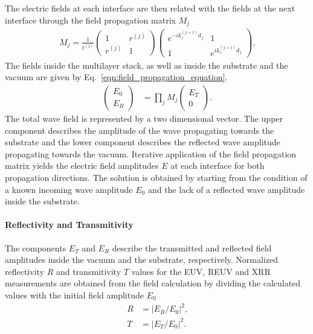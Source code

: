 The electric fields at each interface are then related with the fields at the next interface through the field propagation matrix $M_j$ \cite{mikulik1997x}
\begin{align}
M_j = \frac{1}{t^{(j)}}
\begin{pmatrix}
1 & r^{(j)} \\
r^{(j)} & 1
\end{pmatrix}
\begin{pmatrix}
e^{-i k_z^{(j+1)} d_j} & 1 \\
1 & e^{i k_z^{(j+1)} d_j}
\end{pmatrix}
\text{,} \label{eqn:field_propagation_matrix}
\end{align}
The fields inside the multilayer stack, as well as inside the substrate and the vacuum are given by Eq.~\eqref{eqn:field_propagation_equation}.
\begin{align}
\begin{pmatrix}
E_0 \\
E_R
\end{pmatrix} &=
\prod\limits_{j} M_j
\begin{pmatrix}
E_T \\
0
\end{pmatrix} \text{.} \label{eqn:field_propagation_equation}
\end{align} 
The total wave field is represented by a two dimensional vector. The upper component describes the amplitude of the wave propagating towards the substrate and the lower component describes the reflected wave amplitude propagating towards the vacuum. Iterative application of the field propagation matrix yields the electric field amplitudes $E$ at each interface for both propagation directions. The solution is obtained by starting from the condition of a known incoming wave amplitude $E_0$ and the lack of a reflected wave amplitude inside the substrate.

\paragraph{Reflectivity and Transmitivity}
The components $E_T$ and $E_R$ describe the transmitted and reflected field amplitudes inside the vacuum and the substrate, respectively.
Normalized reflectivity $R$ and transmitivity $T$ values for the EUV, REUV and XRR measurements are obtained from the field calculation by dividing the calculated values with the initial field amplitude $E_0$
\begin{align}
R &= |E_R/E_0|^2\text{,} \nonumber\\
T &= |E_T/E_0|^2 \text{.} \label{eqn:refl_trans}
\end{align}

